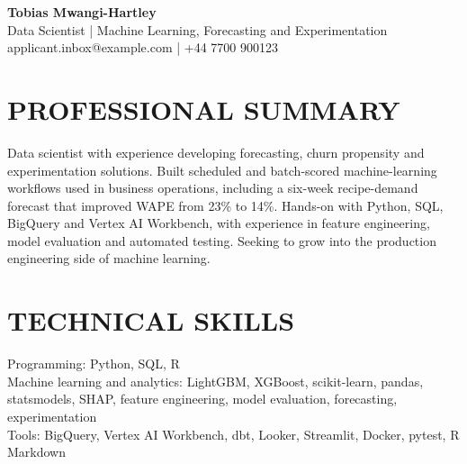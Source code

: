 \documentclass[11pt,a4paper]{article}
\begin{document}
\begin{center}
{\Huge\bfseries\color{primarycolor} Tobias Mwangi-Hartley}\\[0.35em]
{\large\color{accentcolor} Data Scientist | Machine Learning, Forecasting and Experimentation}\\[0.25em]
applicant.inbox@example.com | +44 7700 900123
\end{center}
\vspace{0.5em}

\section*{PROFESSIONAL SUMMARY}
Data scientist with experience developing forecasting, churn propensity and experimentation solutions. Built scheduled and batch-scored machine-learning workflows used in business operations, including a six-week recipe-demand forecast that improved WAPE from 23\% to 14\%. Hands-on with Python, SQL, BigQuery and Vertex AI Workbench, with experience in feature engineering, model evaluation and automated testing. Seeking to grow into the production engineering side of machine learning.

\section*{TECHNICAL SKILLS}
Programming: Python, SQL, R\\
Machine learning and analytics: LightGBM, XGBoost, scikit-learn, pandas, statsmodels, SHAP, feature engineering, model evaluation, forecasting, experimentation\\
Tools: BigQuery, Vertex AI Workbench, dbt, Looker, Streamlit, Docker, pytest, R Markdown
\end{document}
